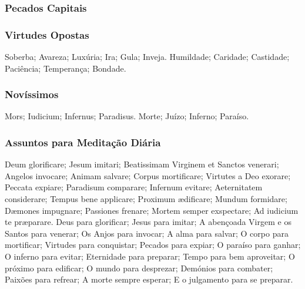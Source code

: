 \begin{paracol}{2}
\subsubsection{Pecados Capitais}
\switchcolumn
\subsubsection{Virtudes Opostas}
\switchcolumn*
Soberba; Avareza; Luxúria; Ira; Gula; Inveja.
\switchcolumn
Humildade; Caridade; Castidade; Paciência; Temperança; Bondade.
\end{paracol}

\subsubsection{Novíssimos}

\begin{paracol}{2}
Mors; Iudicium; Infernus; Paradisus.
\switchcolumn
Morte; Juízo; Inferno; Paraíso.
\end{paracol}

\subsubsection{Assuntos para Meditação Diária}

\begin{paracol}{2}
Deum glorificare; Jesum imitari; Beatissimam Virginem et Sanctos venerari; Angelos invocare; Animam salvare; Corpus mortificare; Virtutes a Deo exorare; Peccata expiare; Paradisum comparare; Infernum evitare; Aeternitatem considerare; Tempus bene applicare; Proximum ædificare; Mundum formidare; Dæmones impugnare; Passiones frenare; Mortem semper exspectare; Ad iudicium te præparare.
\switchcolumn
Deus para glorificar; Jesus para imitar; A abençoada Virgem e os Santos para venerar; Os Anjos para invocar; A alma para salvar; O corpo para mortificar; Virtudes para conquistar; Pecados para expiar; O paraíso para ganhar; O inferno para evitar; Eternidade para preparar; Tempo para bem aproveitar; O próximo para edificar; O mundo para desprezar; Demónios para combater; Paixões para refrear; A morte sempre esperar; E o julgamento para se preparar.
\end{paracol}
